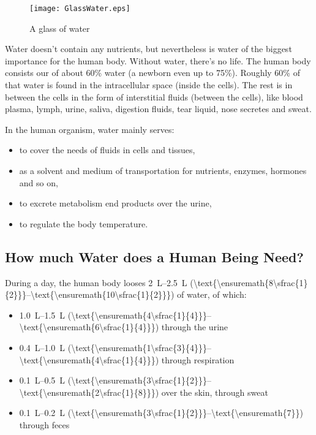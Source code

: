 \documentclass[../main.tex]{subfiles}
\begin{document}
\begin{figure}[htb!]
  \centering
\texttt{[image: GlassWater.eps]}
  \caption{A glass of water~\cite{GlassWater}}
\end{figure}



Water doesn't contain any nutrients, but nevertheless is water of the biggest importance for the human body.
Without water, there's no life.
The human body consists our of about 60\% water (a newborn even up to 75\%).
Roughly 60\% of that water is found in the intracellular space (inside the cells).
The rest is in between the cells in the form of interstitial fluids (between the cells),
like blood plasma, lymph, urine, saliva, digestion fluids, tear liquid, nose secretes and sweat.


In the human organism, water mainly serves:
\begin{itemize}
\item to cover the needs of fluids in cells and tissues,
\item as a solvent and medium of transportation for nutrients, enzymes, hormones and so on,
\item to excrete metabolism end products over the urine,
\item to regulate the body temperature.
\end{itemize}

\subsection{How much Water does a Human Being Need?}

During a day, the human body looses \SIrange{2}{2.5}{\liter}
(\SIrange[parse-numbers=false]{\text{\ensuremath{8\sfrac{1}{2}}}}{\text{\ensuremath{10\sfrac{1}{2}}}}{\cup}) of water, of which:
\begin{itemize}
\item \SIrange{1.0}{1.5}{\L}
  (\SIrange[parse-numbers=false]{\text{\ensuremath{4\sfrac{1}{4}}}}{\text{\ensuremath{6\sfrac{1}{4}}}}{\cup}) through the urine
\item \SIrange{0.4}{1.0}{\L}
  (\SIrange[parse-numbers=false]{\text{\ensuremath{1\sfrac{3}{4}}}}{\text{\ensuremath{4\sfrac{1}{4}}}}{\cup}) through respiration
\item \SIrange{0.1}{0.5}{\L}
  (\SIrange[parse-numbers=false]{\text{\ensuremath{3\sfrac{1}{2}}}}{\text{\ensuremath{2\sfrac{1}{8}}}}{\cup}) over the skin, through sweat
\item \SIrange{0.1}{0.2}{\L}
  (\SIrange[parse-numbers=false]{\text{\ensuremath{3\sfrac{1}{2}}}}{\text{\ensuremath{7}}}{\cup}) through feces
  \end{itemize}
\end{document}

